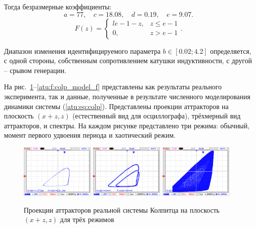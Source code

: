 Тогда безразмерные коэффициенты:
\[
 a = 77,     \quad
 c = 18.08,  \quad
 d = 0.19,   \quad
 e = 9.07.
\]
%
\[
F(z) =
\begin{cases}{l}
  e-1-z, & z \le e-1  \\
  0,     & z  >  e-1
\end{cases}.
\]

Диапазон изменения идентифицируемого параметра
$b \in [ 0.02; 4.2 ]$
определяется, с одной стороны, собственным сопротивлением катушки индуктивности,
с другой -- срывом генерации.

На рис.~\ref{atu:f:colp_real_xzz}--\ref{atu:f:colp_model_f} представлены как результаты реального эксперимента,
так и данные, полученные в результате численного моделирования динамики системы (\ref{atu:eq:colp}).
Представлены проекции аттракторов на плоскость $(x+z,z)$ (естественный вид для осциллографа),
трёхмерный вид аттракторов, и спектры.
На каждом рисунке представлено три режима: обычный, момент первого удвоения периода и хаотический режим.


\begin{figure}[htb!]
 \centerline{
   \includegraphics[width=0.32\textwidth]{p/mod/colp_m1_vv.png}
   \includegraphics[width=0.32\textwidth]{p/mod/colp_m2_vv.png}
   \includegraphics[width=0.32\textwidth]{p/mod/colp_m3_vv_ac.png}
 }
  \caption{Проекции аттракторов реальной системы Колпитца на плоскость $(x+z,z)$
  для трёх режимов}
  \label{atu:f:colp_real_xzz}
\end{figure}

